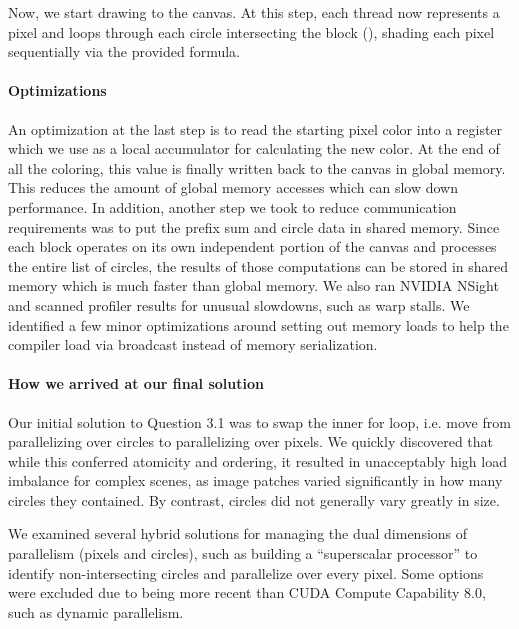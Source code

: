\documentclass[11pt]{article}
\begin{document}
\smallskip
Now, we start drawing to the canvas. At this step, each thread now represents a
pixel and loops through each circle intersecting the block
(), shading each pixel sequentially via the provided
formula. 

\paragraph{Optimizations} An optimization at the last step is to read the
starting pixel color into a register which we use as a local accumulator for
calculating the new color. At the end of all the coloring, this value is finally
written back to the canvas in global memory. This reduces the amount of global
memory accesses which can slow down performance. In addition, another step we
took to reduce communication requirements was to put the prefix sum and circle
data in shared memory. Since each block operates on its own independent portion
of the canvas and processes the entire list of circles, the results of those
computations can be stored in shared memory which is much faster than global
memory. We also ran NVIDIA NSight and scanned profiler results for unusual
slowdowns, such as warp stalls. We identified a few minor optimizations around
setting out memory loads to help the compiler load via broadcast instead of
memory serialization.

\paragraph{How we arrived at our final solution} Our initial solution to
Question 3.1 was to swap the inner for loop, i.e. move from parallelizing over
circles to parallelizing over pixels. We quickly discovered that while this
conferred atomicity and ordering, it resulted in unacceptably high load
imbalance for complex scenes, as image patches varied significantly in how many
circles they contained. By contrast, circles did not generally vary greatly in
size.

\smallskip
We examined several hybrid solutions for managing the dual dimensions of
parallelism (pixels and circles), such as building a “superscalar processor” to
identify non-intersecting circles and parallelize over every pixel. Some options
were excluded due to being more recent than CUDA Compute Capability 8.0, such as
dynamic parallelism.
\end{document}
